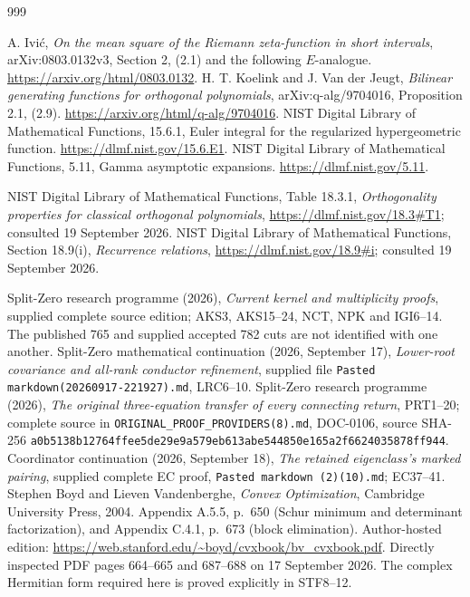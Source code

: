 \begin{thebibliography}{999}

 A. Ivi\'c,
\emph{On the mean square of the Riemann zeta-function in short intervals},
arXiv:0803.0132v3, Section 2, (2.1) and the following \(E\)-analogue.
\url{https://arxiv.org/html/0803.0132}.
 H. T. Koelink and J. Van der Jeugt,
\emph{Bilinear generating functions for orthogonal polynomials},
arXiv:q-alg/9704016, Proposition 2.1, (2.9).
\url{https://arxiv.org/html/q-alg/9704016}.
 NIST Digital Library of Mathematical Functions,
15.6.1, Euler integral for the regularized hypergeometric function.
\url{https://dlmf.nist.gov/15.6.E1}.
 NIST Digital Library of Mathematical Functions,
5.11, Gamma asymptotic expansions.
\url{https://dlmf.nist.gov/5.11}.

NIST Digital Library of Mathematical Functions, Table 18.3.1,
\textit{Orthogonality properties for classical orthogonal polynomials},
\url{https://dlmf.nist.gov/18.3#T1}; consulted 19 September 2026.
NIST Digital Library of Mathematical Functions, Section 18.9(i),
\textit{Recurrence relations},
\url{https://dlmf.nist.gov/18.9#i}; consulted 19 September 2026.

 Split-Zero research programme (2026), \emph{Current kernel and multiplicity proofs}, supplied complete source edition; AKS3, AKS15--24, NCT, NPK and IGI6--14. The published 765 and supplied accepted 782 cuts are not identified with one another.
 Split-Zero mathematical continuation (2026, September 17), \emph{Lower-root covariance and all-rank conductor refinement}, supplied file \texttt{Pasted markdown(20260917-221927).md}, LRC6--10.
 Split-Zero research programme (2026), \emph{The original three-equation transfer of every connecting return}, PRT1--20; complete source in \texttt{ORIGINAL\_PROOF\_PROVIDERS(8).md}, DOC-0106, source SHA-256 \texttt{a0b5138b12764ffee5de29e9a579eb613abe544850e165a2f6624035878ff944}.
 Coordinator continuation (2026, September 18), \emph{The retained eigenclass's marked pairing}, supplied complete EC proof, \texttt{Pasted markdown (2)(10).md}; EC37--41.
Stephen Boyd and Lieven Vandenberghe,
\emph{Convex Optimization}, Cambridge University Press, 2004.
Appendix A.5.5, p.~650 (Schur minimum and determinant factorization),
and Appendix C.4.1, p.~673 (block elimination).
Author-hosted edition: \url{https://web.stanford.edu/~boyd/cvxbook/bv_cvxbook.pdf}.
Directly inspected PDF pages 664--665 and 687--688 on 17 September 2026.
The complex Hermitian form required here is proved explicitly in STF8--12.


\end{thebibliography}
